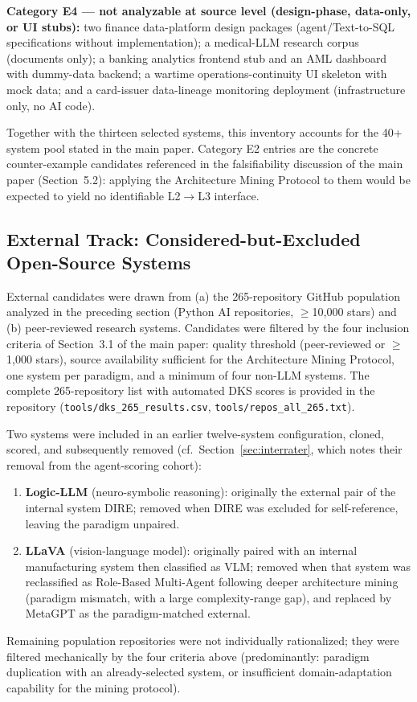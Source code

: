 \documentclass[10pt,a4paper]{article}
\begin{document}
\textbf{Category E4 --- not analyzable at source level (design-phase, data-only, or UI stubs):} two finance data-platform design packages (agent/Text-to-SQL specifications without implementation); a medical-LLM research corpus (documents only); a banking analytics frontend stub and an AML dashboard with dummy-data backend; a wartime operations-continuity UI skeleton with mock data; and a card-issuer data-lineage monitoring deployment (infrastructure only, no AI code).

Together with the thirteen selected systems, this inventory accounts for the 40+ system pool stated in the main paper. Category E2 entries are the concrete counter-example candidates referenced in the falsifiability discussion of the main paper (Section~5.2): applying the Architecture Mining Protocol to them would be expected to yield no identifiable L2$\to$L3 interface.

\subsection{External Track: Considered-but-Excluded Open-Source Systems}

External candidates were drawn from (a) the 265-repository GitHub population analyzed in the preceding section (Python AI repositories, $\geq$10{,}000 stars) and (b) peer-reviewed research systems. Candidates were filtered by the four inclusion criteria of Section~3.1 of the main paper: quality threshold (peer-reviewed or $\geq$1{,}000 stars), source availability sufficient for the Architecture Mining Protocol, one system per paradigm, and a minimum of four non-LLM systems. The complete 265-repository list with automated DKS scores is provided in the repository (\texttt{tools/dks\_265\_results.csv}, \texttt{tools/repos\_all\_265.txt}).

Two systems were included in an earlier twelve-system configuration, cloned, scored, and subsequently removed (cf.\ Section~\ref{sec:interrater}, which notes their removal from the agent-scoring cohort):

\begin{enumerate}[leftmargin=*,itemsep=1pt]
\item \textbf{Logic-LLM} (neuro-symbolic reasoning): originally the external pair of the internal system DIRE; removed when DIRE was excluded for self-reference, leaving the paradigm unpaired.
\item \textbf{LLaVA} (vision-language model): originally paired with an internal manufacturing system then classified as VLM; removed when that system was reclassified as Role-Based Multi-Agent following deeper architecture mining (paradigm mismatch, with a large complexity-range gap), and replaced by MetaGPT as the paradigm-matched external.
\end{enumerate}

Remaining population repositories were not individually rationalized; they were filtered mechanically by the four criteria above (predominantly: paradigm duplication with an already-selected system, or insufficient domain-adaptation capability for the mining protocol).
\end{document}
